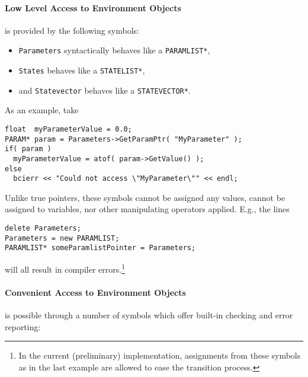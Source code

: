 \documentclass[12pt,a4paper]{article}
\begin{document}
\paragraph{Low Level Access to Environment Objects}
is provided by the following symbols:

\begin{itemize}
\item \texttt{Parameters} syntactically behaves like a \texttt{PARAMLIST*},
\item \texttt{States} behaves like a \texttt{STATELIST*},
\item and \texttt{Statevector} behaves like a \texttt{STATEVECTOR*}.
\end{itemize}
As an example, take
\begin{verbatim}
float  myParameterValue = 0.0;
PARAM* param = Parameters->GetParamPtr( "MyParameter" );
if( param )
  myParameterValue = atof( param->GetValue() );
else
  bcierr << "Could not access \"MyParameter\"" << endl;
\end{verbatim}
Unlike true pointers, these symbols cannot be assigned any values,
cannot be assigned to variables, nor other manipulating operators applied.
E.g., the lines
\begin{verbatim}
delete Parameters;
Parameters = new PARAMLIST;
PARAMLIST* someParamlistPointer = Parameters;
\end{verbatim}
will all result in compiler errors.\footnote{In the current (preliminary)
implementation, assignments from these symbols as in the last example are
allowed to ease the transition process.}

\paragraph{Convenient Access to Environment Objects}
is possible through a number of symbols which offer 
built-in checking and error reporting:
\end{document}
